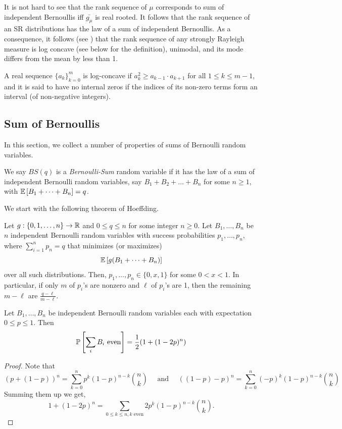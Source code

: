 It is not hard to see that the rank sequence of $\mu$ corresponds to sum of independent Bernoullis iff $\bar{g_\mu}$ is real rooted. It follows that the rank sequence of an SR distributions has the law of a sum of independent Bernoullis. As a consequence, 
it follows  (see \cite{HLP52,Dor64,BBL09})
that the rank sequence of any strongly Rayleigh measure is  log concave (see below for the definition), unimodal, and its mode differs from the mean by less than 1.
\begin{definition}
A real sequence $\{a_k\}^m_{k=0}$ is log-concave if $a^2_k \geq a_{k-1}\cdot a_{k+1}$ for all $1 \leq k\leq m-1$, and it is said to have no internal zeros if the indices of its non-zero terms form an interval (of non-negative integers). 
\end{definition}


\subsection{Sum of Bernoullis}
In this section, we collect a number of properties of sums of Bernoulli random variables.

\begin{definition}\label{def:BS}\hypertarget{tar:BS}{
We say $BS(q)$ is a {\em Bernoulli-Sum} random variable if it has the law of a sum  of independent Bernoulli random variables, say $B_1 + B_2 + \ldots +B_n$  for some $n\ge 1$, with $\E{B_1+ \dots +B_n} = q$. }
\end{definition}

We start with the following theorem of Hoeffding.
\begin{theorem}\label{thm:hoeffding}
Let $g:\{0,1,\dots,n\}\to \R$ and $0\leq q\leq n$ for some integer $n\geq 0$.  Let $B_1,\dots,B_n$ be $n$ independent Bernoulli random variables with success probabilities $p_1,\dots,p_n$, where $\sum_{i=1}^n p_n = q$ that minimizes (or maximizes)
$$ \E{g(B_1+\dots+B_n)}$$
over all such distributions. Then,  $p_1,\dots,p_n\in\{0,x,1\}$ for some $0<x<1$. In particular, if only $m$ of $p_i$'s are nonzero and $\ell$ of $p_i$'s are 1, then the remaining $m-\ell$ are $\frac{q-\ell}{m-\ell}$.
\end{theorem}

\begin{fact} \label{fact:evensum} Let $B_1, \ldots, B_n$ be independent Bernoulli random variables each with expectation $0\le p\le 1$.
Then $$\P{\sum_i B_i \text{ even}} = \frac{1}{2} (1+ (1-2p)^n)$$
\end{fact}
\begin{proof}
Note that
$$
 (p+(1-p))^n = \sum_{k=0}^n p^k (1-p)^{n-k} {n\choose k}\quad\text{ and }\quad
 ((1-p)-p)^n = \sum_{k=0}^n (-p)^k (1-p)^{n-k} {n\choose k}	
$$
Summing them up we get,
$$ 1+ (1-2p)^n = \sum_{0\leq k\leq n, k\text{ even}} 2p^k (1-p)^{n-k} {n\choose k}.$$
\end{proof}


